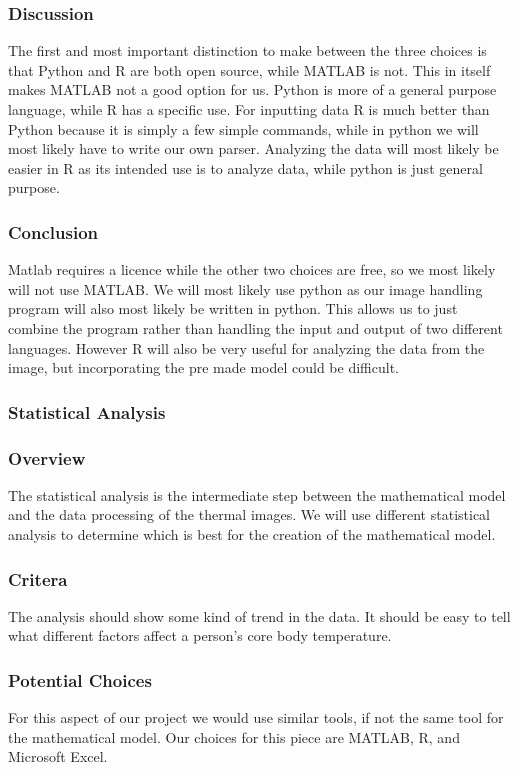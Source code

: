 	\subsubsection*{Discussion}
	The first and most important distinction to make between the three choices is that Python and R are both open source, while MATLAB is not. This in itself makes MATLAB not a good option for us. Python is more of a general purpose language, while R has a specific use. For inputting data R is much better than Python because it is simply a few simple commands, while in python we will most likely have to write our own parser. Analyzing the data will most likely be easier in R as its intended use is to analyze data, while python is just general purpose.
	\subsubsection*{Conclusion}
	Matlab requires a licence while the other two choices are free, so we most likely will not use MATLAB. We will most likely use python as our image handling program will also most likely be written in python. This allows us to just combine the program rather than handling the input and output of two different languages. However R will also be very useful for analyzing the data from the image, but incorporating the pre made model could be difficult.
\subsubsection*{Statistical Analysis}
	\subsubsection*{Overview}
	The statistical analysis is the intermediate step between the mathematical model and the data processing of the thermal images. We will use different statistical analysis to determine which is best for the creation of the mathematical model.
	\subsubsection*{Critera}
	The analysis should show some kind of trend in the data. It should be easy to tell what different factors affect a person’s core body temperature.
	\subsubsection*{Potential Choices}
	For this aspect of our project we would use similar tools, if not the same tool for the mathematical model. Our choices for this piece are MATLAB, R, and Microsoft Excel.
